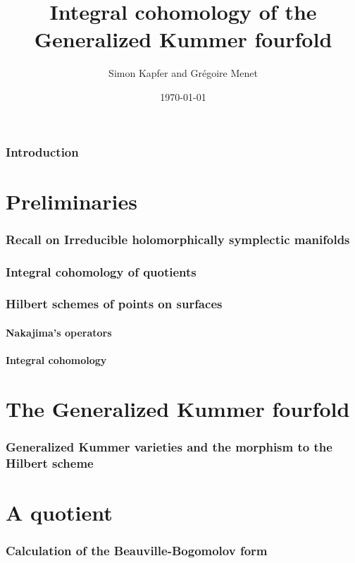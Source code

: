 \documentclass[a4paper]{article}
\begin{document}
\title{Integral cohomology of the Generalized Kummer fourfold}


\author{Simon Kapfer and Gr\'egoire Menet}


\date{\today}

\maketitle
\section{Introduction}
\part{Preliminaries}



\section{Recall on Irreducible holomorphically symplectic manifolds}
\section{Integral cohomology of quotients}
\section{Hilbert schemes of points on surfaces}
	\subsection{Nakajima's operators}
	\subsection{Integral cohomology}
\part{The Generalized Kummer fourfold}
\section{Generalized Kummer varieties and the morphism to the Hilbert scheme}


\part{A quotient}
\section{Calculation of the Beauville-Bogomolov form}


\end{document}

